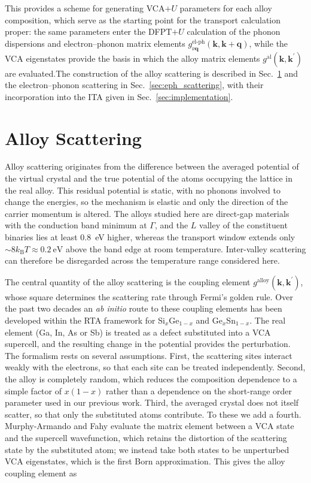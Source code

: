 \documentclass[aps,prmaterials,reprint,amsmath,amssymb,superscriptaddress]{revtex4-2}
\begin{document}
This provides a scheme for generating VCA$+U$ parameters for each alloy composition, which serve as the starting point for the transport calculation proper: the same parameters enter the DFPT$+U$ calculation of the phonon dispersions and electron--phonon matrix elements $g^\text{el-ph}_{\nu\bm{q}}(\bm{k},\bm{k}+\bm{q})$, while the VCA eigenstates provide the basis in which the alloy matrix elements $g^\text{al}(\bm{k},\bm{k}^\prime)$ are evaluated.The construction of the alloy scattering is described in Sec.~\ref{sec:alloy_scattering} and the electron--phonon scattering in Sec.~\ref{sec:eph_scattering}, with their incorporation into the ITA given in Sec.~\ref{sec:implementation}.

\section{Alloy Scattering}\label{sec:alloy_scattering}

Alloy scattering originates from the difference between the averaged potential of the virtual crystal and the true potential of the atoms occupying the lattice in the real alloy. This residual potential is static, with no phonons involved to change the energies, so the mechanism is elastic and only the direction of the carrier momentum is altered. The alloys studied here are direct-gap materials with the conduction band minimum at $\Gamma$, and the $L$ valley of the constituent binaries lies at least \SI{0.8}{\electronvolt} higher, whereas the transport window extends only $\sim 8k_\text{B}T \approx \SI{0.2}{\electronvolt}$ above the band edge at room temperature. Inter-valley scattering can therefore be disregarded across the temperature range considered here.

The central quantity of the alloy scattering is the coupling element $g^\text{alloy}(\bm{k},\bm{k}^\prime)$, whose square determines the scattering rate through Fermi's golden rule. Over the past two decades an \textit{ab initio} route to these coupling elements has been developed within the RTA framework for Si$_x$Ge$_{1-x}$\cite{MurphyArmando2006,MurphyArmando2008} and Ge$_x$Sn$_{1-x}$\cite{Sewell2025}. The real element (Ga, In, As or Sb) is treated as a defect substituted into a VCA supercell, and the resulting change in the potential provides the perturbation. The formalism rests on several assumptions. First, the scattering sites interact weakly with the electrons, so that each site can be treated independently. Second, the alloy is completely random, which reduces the composition dependence to a simple factor of $x(1-x)$ rather than a dependence on the short-range order parameter\cite{Harrison1976} used in our previous work\cite{Gentles2026a}. Third, the averaged crystal does not itself scatter, so that only the substituted atoms contribute. To these we add a fourth. Murphy-Armando and Fahy evaluate the matrix element between a VCA state and the supercell wavefunction, which retains the distortion of the scattering state by the substituted atom; we instead take both states to be unperturbed VCA eigenstates, which is the first Born approximation. This gives the alloy coupling element as
\end{document}
